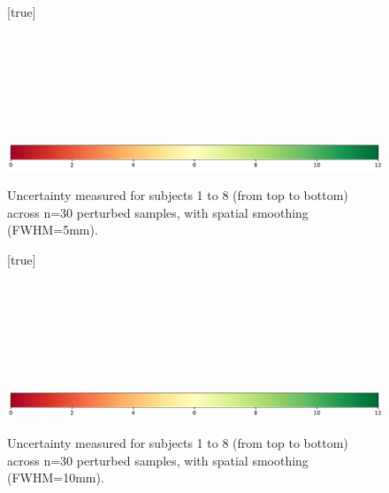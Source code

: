 \documentclass{article}
\begin{document}
\begin{appendices}
    \begin{landscape}
        \begin{figure}
            \vspace*{-2cm}
            \centering
            [true] \\
             \\
             \\
             \\
             \\
             \\
             \\
             \\
            \includegraphics*[width=.7\linewidth]{figures/colorbar_sigbit.pdf}
            \caption{Uncertainty measured for subjects 1 to 8 (from top to bottom) across n=30 perturbed samples, with spatial smoothing (FWHM=5mm). }
            \label{fig:uncertainty-maps-5mm}
        \end{figure}
    \end{landscape}

    \begin{landscape}
        \begin{figure}
            \vspace*{-2cm}
            \centering
            [true] \\
             \\
             \\
             \\
             \\
             \\
             \\
             \\
            \includegraphics*[width=.7\linewidth]{figures/colorbar_sigbit.pdf}
            \caption{Uncertainty measured for subjects 1 to 8 (from top to bottom) across n=30 perturbed samples, with spatial smoothing (FWHM=10mm). }
            \label{fig:uncertainty-maps-10mm}
        \end{figure}
    \end{landscape}


\end{appendices}
\end{document}
